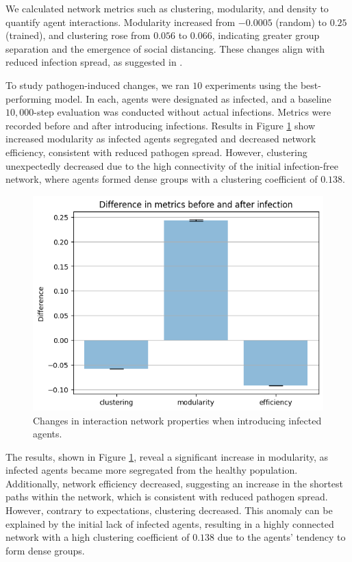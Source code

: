 \documentclass[9pt]{IEEEtran}
\begin{document}
We calculated network metrics such as clustering, modularity, and density to quantify agent interactions. Modularity increased from $-0.0005$ (random) to $0.25$ (trained), and clustering rose from $0.056$ to $0.066$, indicating greater group separation and the emergence of social distancing. These changes align with reduced infection spread, as suggested in \cite{volz2011effects}.

To study pathogen-induced changes, we ran $10$ experiments using the best-performing model. In each, agents were designated as infected, and a baseline $10,000$-step evaluation was conducted without actual infections. Metrics were recorded before and after introducing infections. Results in Figure \ref{fig:induced_changes} show increased modularity as infected agents segregated and decreased network efficiency, consistent with reduced pathogen spread. However, clustering unexpectedly decreased due to the high connectivity of the initial infection-free network, where agents formed dense groups with a clustering coefficient of $0.138$.

\begin{figure}[hbt]
    \centering
    \includegraphics[width=0.8\linewidth]{figures/induced_changes.png}
    \caption{Changes in interaction network properties when introducing infected agents.}
    \label{fig:induced_changes}
\end{figure}

The results, shown in Figure \ref{fig:induced_changes}, reveal a significant increase in modularity, as infected agents became more segregated from the healthy population. Additionally, network efficiency decreased, suggesting an increase in the shortest paths within the network, which is consistent with reduced pathogen spread. However, contrary to expectations, clustering decreased. This anomaly can be explained by the initial lack of infected agents, resulting in a highly connected network with a high clustering coefficient of $0.138$ due to the agents’ tendency to form dense groups.
\end{document}
